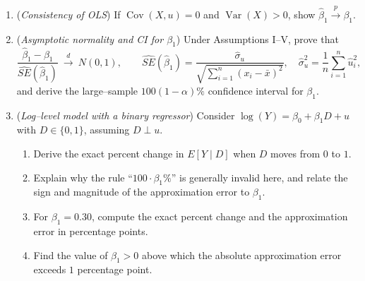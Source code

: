 \documentclass[12pt]{article}
\newcommand{\var}{\operatorname{Var}}
\newcommand{\cov}{\operatorname{Cov}}
\begin{document}
\begin{enumerate}\itemsep20em
\item (\emph{Consistency of OLS})  
If $\cov(X,u)=0$ and $\var(X)>0$, show $\hat\beta_1 \overset{p}{\to} \beta_1$.

\item (\emph{Asymptotic normality and CI for $\beta_1$})  
Under Assumptions I–V, prove that
\[
\frac{\hat{\beta}_1-\beta_1}{\widehat{SE}(\hat{\beta}_1)}\ \xrightarrow{d}\ N(0,1),
\qquad
\widehat{SE}(\hat{\beta}_1)=\frac{\hat{\sigma}_u}{\sqrt{\sum_{i=1}^n (x_i-\bar{x})^2}},
\quad
\hat{\sigma}_u^2=\frac{1}{n}\sum_{i=1}^n \hat{u}_i^2,
\]
and derive the large–sample $100(1-\alpha)\%$ confidence interval for $\beta_1$.

\clearpage

\item (\emph{Log–level model with a binary regressor})  
Consider $\log(Y)=\beta_0+\beta_1D + u$ with $D\in\{0,1\}$, assuming $D \perp u$.  
\begin{enumerate}
    \item  Derive the exact percent change in $E[Y\mid D]$ when $D$ moves from $0$ to $1$.  
    \item  Explain why the rule “$100\cdot\beta_1\%$” is generally invalid here, and relate the sign and magnitude of the approximation error to $\beta_1$.  
    \item  For $\beta_1=0.30$, compute the exact percent change and the approximation error in percentage points.  
    \item  Find the value of $\beta_1>0$ above which the absolute approximation error exceeds $1$ percentage point.
\end{enumerate}

\end{enumerate}
\end{document}
